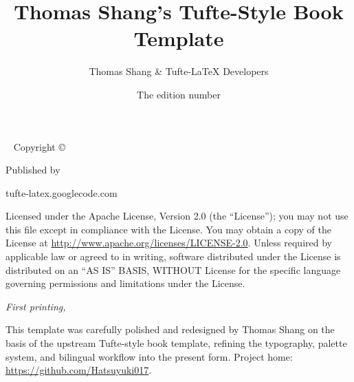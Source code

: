 \documentclass[nofonts,nohyper,nobib]{tufte-book}
\title{Thomas Shang's Tufte-Style Book Template}
\date{The edition number}
\author[Thomas Shang \& Tufte-LaTeX Developers]{Thomas Shang \& Tufte-LaTeX Developers}
\begin{document}
\frontmatter




\maketitle


\newpage
\begin{fullwidth}
~\vfill
\thispagestyle{empty}
\setlength{\parindent}{0pt}
\setlength{\parskip}{\baselineskip}
Copyright \copyright\ \the\year\ \thanklessauthor

\par Published by \thanklesspublisher

\par tufte-latex.googlecode.com

\par Licensed under the Apache License, Version 2.0 (the ``License''); you may not
use this file except in compliance with the License. You may obtain a copy
of the License at \url{http://www.apache.org/licenses/LICENSE-2.0}. Unless
required by applicable law or agreed to in writing, software distributed
under the License is distributed on an ``AS IS'' BASIS, WITHOUT
License for the specific language governing permissions and limitations
under the License.

\par\textit{First printing, \monthyear}

\par\medskip
This template was carefully polished and redesigned by Thomas Shang on the
basis of the upstream Tufte-style book template, refining the typography,
palette system, and bilingual workflow into the present form. Project home:
\url{https://github.com/Hatsuyuki017}.
\end{fullwidth}
\end{document}
